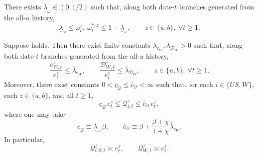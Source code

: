 \documentclass{article}
\begin{document}
\begin{ass}\label{ass_interior_equity_weights}
There exists $\underline\lambda_\omega\in(0,1/2)$ such that, along both date-$t$ branches generated from the all-$u$ history,
\[
\underline\lambda_\omega
\le
\omega_t^z,\ \omega_t^{*,z}
\le
1-\underline\lambda_\omega,
\qquad
z\in\{u,b\},\ \forall t\ge 1.
\]
\end{ass}

\begin{lem}\label{lem_relative_dividend_bounds}
\label{lem_stock_value_bounds}
Suppose  holds. Then there exist finite constants
$\overline\lambda_{e_W},\overline\lambda_{\mathcal D_W}>0$ such that, along both date-$t$ branches generated from the all-$u$ history,
\[
\frac{e_{W,t}^z}{e_t^z}\le \overline\lambda_{e_W},
\qquad
\frac{\mathcal D_{W,t}^z}{e_t^z}\le \overline\lambda_{\mathcal D_W},
\qquad
z\in\{u,b\},\ \forall t\ge 1.
\]
Moreover, there exist constants $0<\underline c_{\mathcal Q}\le \overline c_{\mathcal Q}<\infty$ such that, for each $i\in\{US,W\}$, each $z\in\{u,b\}$, and all $t\ge 1$,
\[
\underline c_{\mathcal Q}\,e_t^z
\le
\mathcal Q_{i,t}^z
\le
\overline c_{\mathcal Q}\,e_t^z,
\]
where one may take
\[
\underline c_{\mathcal Q}\equiv \underline\lambda_\omega\,\beta,
\qquad
\overline c_{\mathcal Q}\equiv
\beta+\frac{\beta+\chi}{1+\chi}\overline\lambda_{e_W}.
\]
In particular,
\[
\mathcal Q_{US,t}^z\asymp e_t^z,
\qquad
\mathcal Q_{W,t}^z\asymp e_t^z.
\]
\end{lem}
\end{document}
